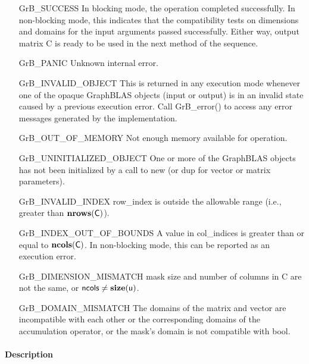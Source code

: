 \begin{itemize}[leftmargin=2.1in]
    \item[{\sf GrB\_SUCCESS}]         In blocking mode, the operation completed
    successfully. In non-blocking mode, this indicates that the compatibility 
    tests on dimensions and domains for the input arguments passed successfully. 
    Either way, output matrix {\sf C} is ready to be used in the next method of 
    the sequence.

    \item[{\sf GrB\_PANIC}]            Unknown internal error.

    \item[{\sf GrB\_INVALID\_OBJECT}] This is returned in any execution mode 
    whenever one of the opaque GraphBLAS objects (input or output) is in an invalid 
    state caused by a previous execution error.  Call {GrB\_error()} to access 
    any error messages generated by the implementation.

    \item[{\sf GrB\_OUT\_OF\_MEMORY}]  Not enough memory available for operation.

    \item[{\sf GrB\_UNINITIALIZED\_OBJECT}] One or more of the GraphBLAS objects
    has not been initialized by a call to {\sf new} (or {\sf dup} for vector or
    matrix parameters).

    \item[{\sf GrB\_INVALID\_INDEX}]    {\sf row\_index} is outside the allowable 
    range (i.e., greater than $\bold{nrows}({\sf C})$).

    \item[{\sf GrB\_INDEX\_OUT\_OF\_BOUNDS}]  A value in {\sf col\_indices} 
    is greater than or equal to $\bold{ncols}({\sf C})$.  In 
    non-blocking mode, this can be reported as an execution error.

    \item[{\sf GrB\_DIMENSION\_MISMATCH}] {\sf mask} size and number of columns
    in {\sf C} are not the same, or ${\sf ncols} \neq \bold{size}({\sf u})$.

    \item[{\sf GrB\_DOMAIN\_MISMATCH}]     The domains of the matrix and vector
    are incompatible with each other or the corresponding domains of the 
    accumulation operator, or the mask's domain is not compatible with bool.
\end{itemize}

\paragraph{Description}

